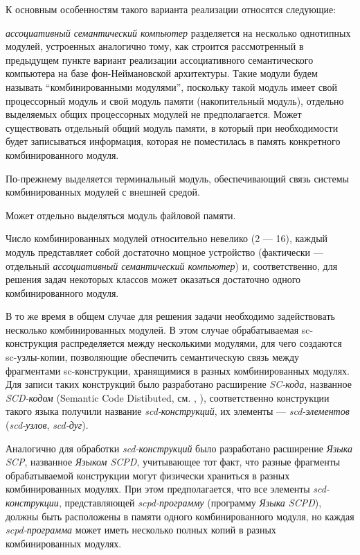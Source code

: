 К основным особенностям такого варианта реализации относятся следующие:
\begin{textitemize}
	\item \textit{ассоциативный семантический компьютер} разделяется на несколько однотипных модулей, устроенных аналогично тому, как строится рассмотренный в предыдущем пункте вариант реализации ассоциативного семантического компьютера на базе фон-Неймановской архитектуры. Такие модули будем называть ``комбинированными модулями'', поскольку такой модуль имеет свой процессорный модуль и свой модуль памяти (накопительный модуль), отдельно выделяемых общих процессорных модулей не предполагается. Может существовать отдельный общий модуль памяти, в который при необходимости будет записываться информация, которая не поместилась в память конкретного комбинированного модуля.
	\item По-прежнему выделяется терминальный модуль, обеспечивающий связь системы комбинированных модулей с внешней средой.
	\item Может отдельно выделяться модуль файловой памяти.
	\item Число комбинированных модулей относительно невелико (2 --- 16), каждый модуль представляет собой достаточно мощное устройство (фактически --- отдельный \textit{ассоциативный семантический компьютер}) и, соответственно, для решения задач некоторых классов может оказаться достаточно одного комбинированного модуля.
	\item В то же время в общем случае для решения задачи необходимо задействовать несколько комбинированных модулей. В этом случае обрабатываемая sc-конструкция распределяется между несколькими модулями, для чего создаются sc-узлы-копии, позволяющие обеспечить семантическую связь между фрагментами sc-конструкции, хранящимися в разных комбинированных модулях. Для записи таких конструкций было разработано расширение \textit{SC-кода}, названное \textit{SCD-кодом} (Semantic Code Distibuted, см. , ), соответственно конструкции такого языка получили название \textit{scd-конструкций}, их элементы --- \textit{scd-элементов} (\textit{scd-узлов}, \textit{scd-дуг}).
	\item Аналогично для обработки \textit{scd-конструкций} было разработано расширение \textit{Языка SCP}, названное \textit{Языком SCPD}, учитывающее тот факт, что разные фрагменты обрабатываемой конструкции могут физически храниться в разных комбинированных модулях. При этом предполагается, что все элементы \textit{scd-конструкции}, представляющей \textit{scpd-программу} (программу \textit{Языка SCPD}), должны быть расположены в памяти одного комбинированного модуля, но каждая \textit{scpd-программа} может иметь несколько полных копий в разных комбинированных модулях.

\end{textitemize}
